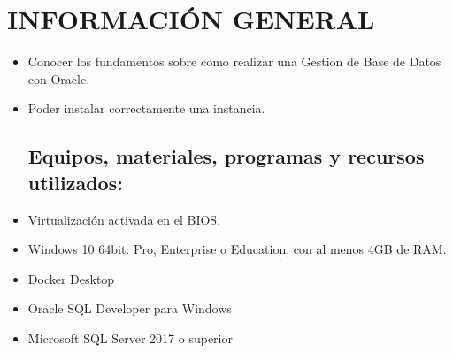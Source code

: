 \section{INFORMACIÓN GENERAL} 

\begin{itemize}
\subsection{Objetivos:}
	\item Conocer los fundamentos sobre como realizar una Gestion de Base de Datos con Oracle.
	\item Poder instalar correctamente una instancia.
\subsection{Equipos, materiales, programas y recursos utilizados:}
	\item Virtualización activada en el BIOS.
	\item Windows 10 64bit: Pro, Enterprise o Education, con al menos 4GB de RAM.
	\item Docker Desktop
	\item Oracle SQL Developer para Windows
	\item Microsoft SQL Server 2017 o superior

\end{itemize}
